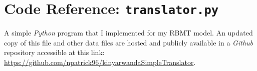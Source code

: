 \chapter{Code Reference: \texttt{translator.py}}
A simple \textit{Python} program that I implemented for my RBMT model. An updated copy of this file and other data files are hosted and publicly available in a \textit{Github} repository accessible at this link: \url{https://github.com/npatrick96/kinyarwandaSimpleTranslator}. \newline
